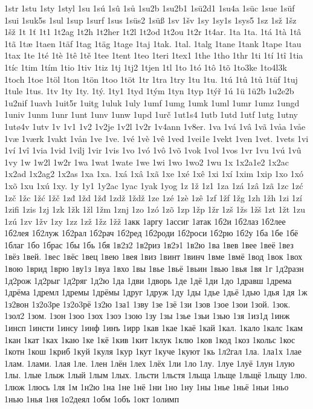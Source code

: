 1str
1stu
1sty
1styl
1su
1sú
1sû
1sů
1su2b
1su2b1
1sü2d1
1su4a
1süc
1sue
1süf
1sui
1suk5s
1sul
1sup
1surf
1sus
1süs2
1süß
1sv
1šv
1sy
1sy1s
1sys5
1sz
1sž
1šz
1šž
1t
1ť
1t1
1t2ag
1t2h
1t2her
1t2l
1t2od
1t2ou
1t2r
1t4ar.
1ta
1ta.
1tá
1tà
1tâ
1tã
1tæ
1taen
1täf
1tag
1täg
1tage
1taj
1tak.
1tal.
1talg
1tane
1tank
1tape
1tau
1tax
1te
1té
1tè
1tê
1tě
1tee
1tent
1teo
1teri
1tex1
1the
1tho
1thr
1ti
1tí
1tî
1tia
1tíc
1tim
1tím
1tio
1tiv
1tiz
1tj
1tj2
1tjen
1tl
1to
1tó
1tô
1tõ
1to3ke
1to4l3k
1toch
1toe
1töl
1ton
1tön
1too
1töt
1tr
1tra
1try
1tu
1tu.
1tú
1tû
1tů
1tüf
1tuj
1tule
1tus.
1tv
1ty
1ty.
1tý.
1ty1
1tyd
1tým
1tyn
1typ
1týř
1ú
1ü
1ü2b
1u2e2b
1u2nif
1uavh
1uit5r
1uitg
1uluk
1uly
1umf
1umg
1umk
1uml
1umr
1umz
1ungd
1univ
1unm
1unr
1unt
1unv
1unw
1upd
1urč
1ut1s4
1utb
1utd
1utf
1utg
1utny
1utø4v
1utv
1v
1v1
1v2
1v2je
1v2l
1v2r
1v4ann
1v8er.
1va
1vá
1vâ
1vã
1våa
1våe
1væ
1værk
1vakt
1vån
1ve
1ve.
1vé
1vè
1vê
1ved
1vei1e
1vekt
1ven
1vet.
1vets
1vi
1ví
1vî
1via
1vid
1vilj
1vir
1vis
1vo
1vó
1vô
1võ
1vok
1vol
1vos
1vr
1vu
1vú
1vû
1vy
1w
1w2l
1w2r
1wa
1wat
1wate
1we
1wi
1wo
1wo2
1wu
1x
1x2a1e2
1x2ac
1x2ad
1x2ag2
1x2as
1xa
1xa.
1xá
1xâ
1xã
1xe
1xé
1xê
1xi
1xí
1xim
1xip
1xo
1xó
1xõ
1xu
1xú
1xy.
1y
1y1
1y2ac
1yac
1yak
1yog
1z
1ž
1z1
1za
1zá
1zâ
1zã
1zc
1zć
1zč
1žc
1žć
1žč
1zđ
1žd
1žđ
1zdž
1ždž
1ze
1zé
1zè
1zê
1zf
1žf
1žg
1zh
1žh
1zi
1zí
1zifi
1zis
1zj
1zk
1žk
1žl
1žm
1znj
1zo
1zó
1zõ
1zp
1žp
1žr
1zš
1žs
1žš
1zt
1žt
1zu
1zú
1zv
1žv
1zy
1zz
1zž
1žz
1žž
1акк
1аргу
1ассиг
1атак
1б2и
1б2лаз
1б2лее
1б2лея
1б2луж
1б2рал
1б2рач
1б2ред
1б2роди
1б2роси
1б2рю
1б2у
1ба
1бе
1бё
1благ
1бо
1брас
1бы
1бь
1бя
1в2з2
1в2риз
1в2э1
1в2ю
1ва
1вев
1вее
1веё
1вез
1вёз
1вей.
1вес
1вёс
1вец
1вею
1вея
1виз
1винт
1винч
1вме
1вмё
1вод
1вок
1вох
1вою
1врид
1врю
1ву1з
1вуа
1вхо
1вы
1вье
1вьё
1вьин
1вью
1вья
1вя
1г
1д2разн
1д2рож
1д2рыг
1д2ряг
1д2ю
1да
1дви
1дворь
1де
1дё
1ди
1до
1дравш
1дрема
1дрёма
1дремл
1дремы
1дрёмы
1друг
1друж
1ду
1ды
1дье
1дьё
1дью
1дья
1дя
1ж
1з2вон
1з2о3ре
1з2о3рё
1з2ю
1за1
1зву
1зе
1зё
1зи
1зов
1зое
1зои
1зой.
1зок.
1зол2
1зом.
1зон
1зоо
1зох
1зоэ
1зою
1зу
1зы
1зье
1зьи
1зью
1зя
1из1д
1инж
1инсп
1инсти
1инсу
1инф
1инъ
1ирр
1кав
1кае
1каё
1кай
1кал.
1кало
1калс
1кам
1кан
1кат
1ках
1каю
1ке
1кё
1кив
1кит
1клук
1клю
1ков
1код
1коз
1кольс
1кос
1котн
1кош
1криб
1куй
1куля
1кур
1кут
1куче
1куют
1кь
1л2гал
1ла.
1ла1х
1лае
1лам.
1лами.
1лая
1ле.
1лен
1лён
1лех
1лёх
1ли
1ло
1лу.
1луе
1луё
1лун
1лую
1лы.
1лые
1лыж
1лый
1лым
1лых.
1льсти
1льстя
1льща
1льще
1льщё
1льщу
1лю.
1люж
1люсь
1ля
1м
1н2ю
1на
1не
1нё
1ни
1но
1ну
1ны
1нье
1ньё
1ньи
1ньо
1нью
1нья
1ня
1о2деял
1обм
1объ
1окт
1олимп
